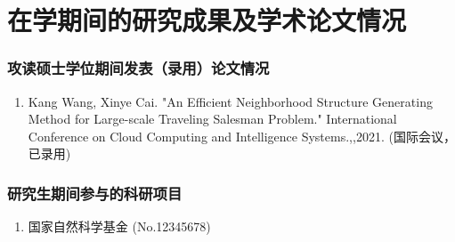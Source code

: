 \chapter{在学期间的研究成果及学术论文情况}


\subsection*{攻读硕士学位期间发表（录用）论文情况}

\begin{enumerate}
  \item Kang Wang, Xinye Cai. "An Efficient Neighborhood Structure Generating Method for Large-scale Traveling Salesman Problem." International Conference on Cloud Computing and Intelligence Systems.,,2021. (国际会议，已录用)
\end{enumerate}

\subsection*{研究生期间参与的科研项目}

\begin{enumerate}
  \item 国家自然科学基金 (No.12345678)
\end{enumerate}

